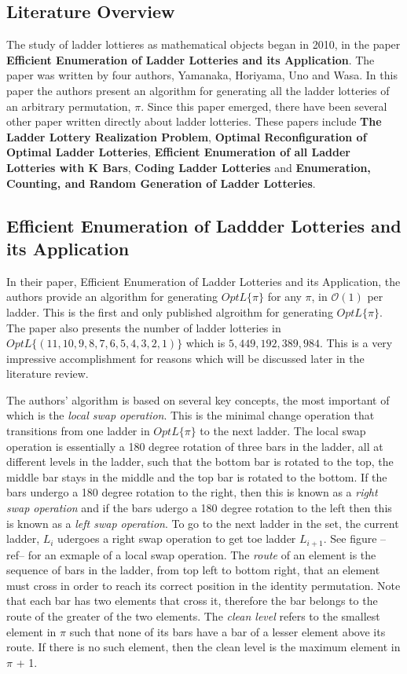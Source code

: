 
\subsection{Literature Overview}
The study of ladder lottieres as mathematical objects began in 2010, in  the paper
\textbf{Efficient Enumeration of Ladder Lotteries and its Application}. The paper was 
written by four authors, Yamanaka, Horiyama, Uno and Wasa. In this paper the 
authors present an algorithm for generating all the ladder lotteries of an 
arbitrary permutation, $\pi$. Since this paper emerged, there have been 
several other paper written directly about ladder lotteries. 
These papers include \textbf{The Ladder Lottery Realization Problem},
\textbf{Optimal Reconfiguration of Optimal Ladder Lotteries}, 
\textbf{Efficient Enumeration of all Ladder Lotteries with K Bars},
\textbf{Coding Ladder Lotteries} and
\textbf{Enumeration, Counting, and Random Generation of Ladder Lotteries}.
\subsection{Efficient Enumeration of Laddder Lotteries and its Application}
In their paper, Efficient Enumeration of Ladder Lotteries and its Application,
the authors provide an algorithm for generating $OptL\{\pi\}$ 
for any $\pi$, in $\mathcal{O}(1)$ per ladder. This is the first and only 
published algroithm for generating $OptL\{\pi\}$. The paper also presents the number 
of ladder lotteries in $OptL\{(11, 10, 9, 8, 7, 6, 5, 4, 3, 2, 1)\}$ which is 
$5,449,192,389,984$. This is a very impressive accomplishment for reasons which 
will be discussed later in the literature review.\par 
The authors' algorithm is based on several key concepts, the most 
important of which is the \emph{local swap operation}. This is the 
minimal change operation that transitions from one ladder in $OptL\{\pi\}$ to the 
next ladder. The local swap operation is essentially a 180 degree rotation
of three bars in the ladder, all at different levels in the ladder, such that the bottom
bar is rotated to the top, the middle bar stays in the middle and the top bar
is rotated to the bottom. If the bars undergo a 180 degree rotation to the right, 
then this is known as a \emph{right swap operation} and 
if the bars udergo a 180 degree rotation to the left then this 
is known as a \emph{left swap operation}. To go to the next ladder in the set, 
the current ladder, $L_{i}$ udergoes a right swap operation 
to get toe ladder $L_{i+1}$. See figure --ref-- for an exmaple of a 
local swap operation. The \emph{route} of an element is the sequence of bars in the ladder, from top left to 
bottom right, that an element must cross in order to reach its correct position in 
the identity permutation. Note that each bar has two elements that cross it, 
therefore the bar belongs to the route of the greater of the two elements.
The \emph{clean level} refers to the smallest element 
in $\pi$ such that none of its bars have a bar of a lesser element above its route.
If there is no such element, then the clean level is the maximum element in $\pi$ + 1.

